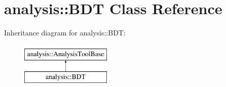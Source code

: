 \hypertarget{classanalysis_1_1BDT}{}\section{analysis\+:\+:B\+DT Class Reference}
\label{classanalysis_1_1BDT}
Inheritance diagram for analysis\+:\+:B\+DT\+:\begin{figure}[H]
\begin{center}
\leavevmode
\includegraphics[height=2.000000cm]{classanalysis_1_1BDT}
\end{center}
\end{figure}
